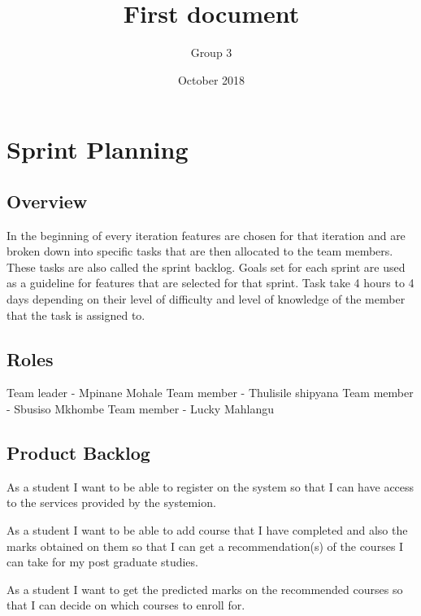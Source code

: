 \documentclass[10pt]{article}
\title{First document}
\author{Group 3}
\date{October 2018}
\begin{document}
\section{Sprint Planning}

\subsection{Overview}

In the beginning of every iteration features are chosen for that iteration and are broken down into specific tasks that are then allocated to the team members. These tasks are also called the sprint backlog. Goals set for each sprint are used as a guideline for features that are selected for that sprint. Task take 4 hours to 4 days depending on their level of difficulty and level of knowledge of the member that the task is assigned to.

\subsection{Roles}

Team leader - Mpinane Mohale
Team member - Thulisile shipyana
Team member -  Sbusiso Mkhombe
Team member - Lucky Mahlangu

\subsection{Product Backlog}

\begin{description}[font=$\bullet$~\normalfont\scshape\color{red!50!black}]

\item [] As a student I want to be able to register on the system so that I can have access to the services provided by the systemion.
\item [] As a student I want to be able to add course that I have completed and also the marks obtained on them so that I can get a recommendation(s) of the courses I can take for my post graduate studies.
\item [] As a student I want to get the predicted marks on the recommended courses so that I can decide on which courses to enroll for.
\end{description}
\end{document}
